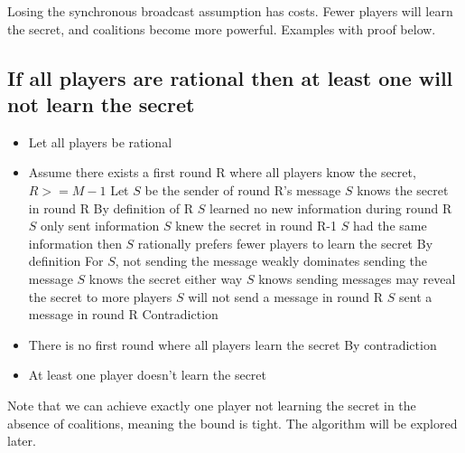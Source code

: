 \documentclass{article}
\begin{document}
Losing the synchronous broadcast assumption has costs. Fewer players will learn the secret, and coalitions become more powerful. Examples with proof below.

\subsection{If all players are rational then at least one will not learn the secret}
\begin{itemize}
  \item Let all players be rational
  \item Assume there exists a first round R where all players know the secret, $R >= M-1$
  \subitem Let $S$ be the sender of round R's message
  \subitem $S$ knows the secret in round R
  \subsubitem By definition of R
  \subitem $S$ learned no new information during round R
  \subsubitem $S$ only sent information
  \subitem $S$ knew the secret in round R-1
  \subsubitem $S$ had the same information then
  \subitem $S$ rationally prefers fewer players to learn the secret 
  \subsubitem By definition
  \subitem For $S$, not sending the message weakly dominates sending the message
  \subsubitem $S$ knows the secret either way
  \subsubitem $S$ knows sending messages may reveal the secret to more players
  \subitem $S$ will not send a message in round R
  \subitem $S$ sent a message in round R
  \subitem Contradiction
  \item There is no first round where all players learn the secret
  \subitem By contradiction
  \item At least one player doesn't learn the secret
\end{itemize}

Note that we can achieve exactly one player not learning the secret in the absence of coalitions, meaning the bound is tight. The algorithm will be explored later.
\end{document}
